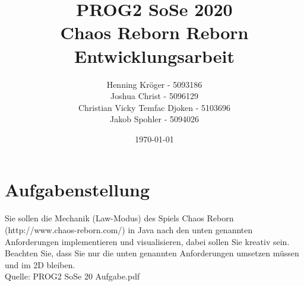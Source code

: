 \documentclass[a4paper,12pt]{scrartcl}
\title{PROG2 SoSe 2020\\Chaos Reborn Reborn\\Entwicklungsarbeit}
\author{Henning Kröger - 5093186 \\Joshua Christ - 5096129 \\Christian Vicky Temfac Djoken - 5103696\\ Jakob Spohler - 5094026}
\date{\today}
\begin{document}
	\maketitle %
	\thispagestyle{empty}
	\newpage %
	\pagestyle{plain}
	\tableofcontents %
	\newpage
	\section{Aufgabenstellung}
	\glqq Sie sollen die Mechanik (Law-Modus) des Spiels Chaos Reborn (http://www.chaos-reborn.com/) in Java nach den unten genannten Anforderungen implementieren und visualisieren, dabei sollen Sie kreativ sein. Beachten Sie, dass Sie nur die unten genannten Anforderungen umsetzen müssen und im 2D bleiben.\grqq \\Quelle: PROG2 SoSe 20 Aufgabe.pdf
\end{document}
